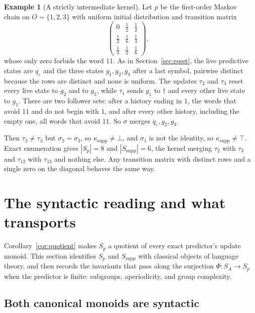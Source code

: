 \documentclass[10pt]{article}
\theoremstyle{definition}
\newtheorem{example}[theorem]{Example}
\theoremstyle{remark}
\newcommand{\Obs}{O}
\newcommand{\eps}{\varepsilon}
\begin{document}
\begin{example}[A strictly intermediate kernel]
\label{ex:one-zero}
Let $p$ be the first-order Markov chain on $\Obs=\{1,2,3\}$ with
uniform initial distribution and transition matrix
\[
  \begin{pmatrix}
    0&\frac12&\frac12\\[2pt]
    \frac12&\frac16&\frac13\\[2pt]
    \frac13&\frac12&\frac16
  \end{pmatrix},
\]
whose only zero forbids the word $11$.  As in
Section~\ref{sec:reset}, the live predictive states are $q_\eps$ and
the three states $g_1,g_2,g_3$ after a last symbol, pairwise distinct
because the rows are distinct and none is uniform.  The updates
$\tau_2$ and $\tau_3$ reset every live state to $g_2$ and to $g_3$,
while $\tau_1$ sends $g_1$ to $\dagger$ and every other live state to
$g_1$.  There are two follower sets: after a history ending in $1$,
the words that avoid $11$ and do not begin with $1$, and after every
other history, including the empty one, all words that avoid $11$.
So $\sigma$ merges $q_\eps,g_2,g_3$.

Then $\tau_2\ne\tau_3$ but $\sigma_2=\sigma_3$, so
$\kappa_{\mathrm{supp}}\ne\bot$, and $\sigma_1$ is not the identity,
so $\kappa_{\mathrm{supp}}\ne\top$.  Exact enumeration gives
$|S_p|=8$ and $|S_{\mathrm{supp}}|=6$, the kernel merging $\tau_2$
with $\tau_3$ and $\tau_{12}$ with $\tau_{13}$ and nothing else.  Any
transition matrix with distinct rows and a single zero on the
diagonal behaves the same way.
\end{example}

\section{The syntactic reading and what transports}
\label{sec:syntactic}

Corollary~\ref{cor:quotient} makes $S_p$ a quotient of every exact
predictor's update monoid.  This section identifies $S_p$ and
$S_{\mathrm{supp}}$ with classical objects of language theory, and
then records the invariants that pass along the surjection
$\Phi:S_A\to S_p$ when the predictor is finite: subgroups,
aperiodicity, and group complexity.

\subsection{Both canonical monoids are syntactic}
\end{document}
